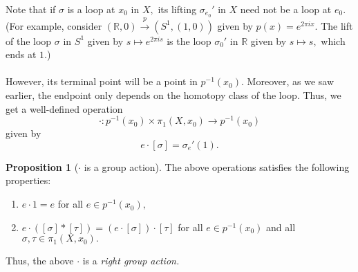 \documentclass[12pt]{article}
\theoremstyle{definition}
\numberwithin{thm}{section}
\newtheorem{prop}[thm]{Proposition}
\begin{document}
Note that if $\sigma$ is a loop at $x_0$ in $X,$ its lifting $\sigma_{e_0}'$ in $X$ need not be a loop at $e_0.$ (For example, consider $(\mathbb{R}, 0) \overset{p}{\longrightarrow} (S^1, (1, 0))$ given by $p(x) = e^{2\pi ix}.$ The lift of the loop $\sigma$ in $S^1$ given by $s \mapsto e^{2\pi is}$ is the loop $\sigma_0'$ in $\mathbb{R}$ given by $s \mapsto s,$ which ends at $1.$)\\~\\
However, its terminal point will be a point in $p^{-1}(x_0).$ Moreover, as we saw earlier, the endpoint only depends on the homotopy class of the loop. Thus, we get a well-defined operation
\begin{equation*} 
	\cdot:p^{-1}(x_0) \times \pi_1(X, x_0) \to p^{-1}(x_0)
\end{equation*}
given by
\begin{equation*} 
	e\cdot[\sigma] = \sigma_e'(1).
\end{equation*}
\begin{prop}[$\cdot$ is a group action] \label{prop:dotisgroupact}
	The above operations satisfies the following properties:
	\begin{enumerate}
		\item $e\cdot 1 = e$ for all $e \in p^{-1}(x_0),$
		\item $e\cdot([\sigma]*[\tau]) = (e \cdot [\sigma])\cdot[\tau]$ for all $e \in p^{-1}(x_0)$ and all $\sigma, \tau \in \pi_1(X, x_0).$
	\end{enumerate}
\end{prop}
Thus, the above $\cdot$ is a \emph{right group action.}
\end{document}
